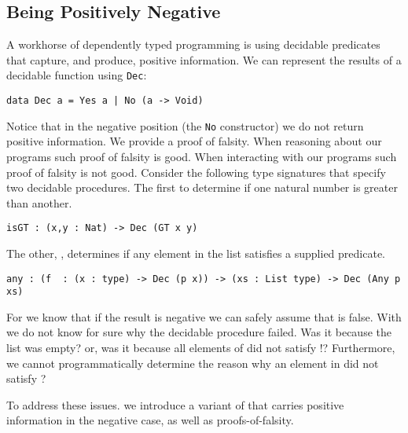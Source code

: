 \subsection{Being Positively Negative}
\label{sec:idioms:posneg}

A workhorse of dependently typed programming is using decidable
predicates that capture, and produce, positive information.
We can represent the results of a decidable function using \texttt{Dec}:

\begin{verbatim}
data Dec a = Yes a | No (a -> Void)
\end{verbatim}

\noindent
Notice that in the negative position (the \texttt{No} constructor) we do not return positive information.
We provide a proof of falsity.
When reasoning about our programs such proof of falsity is good.
When interacting with our programs such proof of falsity is not good.
Consider the following type signatures that specify two decidable procedures.
The first to determine if one natural number is greater than another.

\begin{verbatim}
isGT : (x,y : Nat) -> Dec (GT x y)
\end{verbatim}

\noindent
The other, , determines if any element in the list satisfies a supplied predicate.

\begin{verbatim}
any : (f  : (x : type) -> Dec (p x)) -> (xs : List type) -> Dec (Any p xs)
\end{verbatim}

For  we know that if the result is negative we can safely assume that   is false.
With  we do not know for sure why the decidable procedure failed.
Was it because the list was empty?
or,
was it because all elements of  did not satisfy !?
Furthermore, we cannot programmatically determine the reason why an element in  did not satisfy ?

To address these issues. we introduce  a variant of  that carries positive information in the negative case, as well as proofs-of-falsity.


